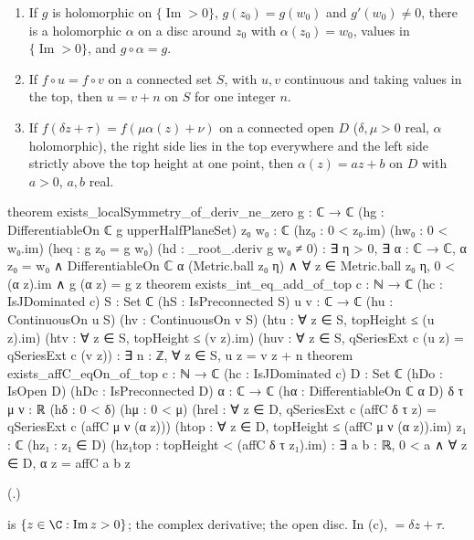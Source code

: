 \begin{theorem}\label{ch19:thm:localtop}
\begin{enumerate}[label=(\alph*)]
\item If $g$ is holomorphic on $\{\operatorname{Im}>0\}$, $g(z_0)=g(w_0)$ and $g'(w_0)\ne0$, there is a holomorphic $\alpha$ on a disc
  around $z_0$ with $\alpha(z_0)=w_0$, values in $\{\operatorname{Im}>0\}$, and $g\circ\alpha=g$.
\item If $f\circ u=f\circ v$ on a connected set $S$, with $u,v$ continuous and taking values in the top, then $u=v+n$ on $S$ for one
  integer $n$.
\item If $f(\delta z+\tau)=f(\mu\alpha(z)+\nu)$ on a connected open $D$ ($\delta,\mu>0$ real, $\alpha$ holomorphic), the right side lies in the
  top everywhere and the left side strictly above the top height at one point, then $\alpha(z)=az+b$ on $D$ with $a>0$, $a,b$ real.
\end{enumerate}
\end{theorem}
\begin{leancode}
theorem exists_localSymmetry_of_deriv_ne_zero {g : ℂ → ℂ}
    (hg : DifferentiableOn ℂ g upperHalfPlaneSet) {z₀ w₀ : ℂ} (hz₀ : 0 < z₀.im)
    (hw₀ : 0 < w₀.im) (heq : g z₀ = g w₀) (hd : _root_.deriv g w₀ ≠ 0) :
    ∃ η > 0, ∃ α : ℂ → ℂ, α z₀ = w₀ ∧ DifferentiableOn ℂ α (Metric.ball z₀ η) ∧
      ∀ z ∈ Metric.ball z₀ η, 0 < (α z).im ∧ g (α z) = g z
theorem exists_int_eq_add_of_top {c : ℕ → ℂ} (hc : IsJDominated c) {S : Set ℂ}
    (hS : IsPreconnected S) {u v : ℂ → ℂ} (hu : ContinuousOn u S) (hv : ContinuousOn v S)
    (htu : ∀ z ∈ S, topHeight ≤ (u z).im) (htv : ∀ z ∈ S, topHeight ≤ (v z).im)
    (huv : ∀ z ∈ S, qSeriesExt c (u z) = qSeriesExt c (v z)) :
    ∃ n : ℤ, ∀ z ∈ S, u z = v z + n
theorem exists_affC_eqOn_of_top {c : ℕ → ℂ} (hc : IsJDominated c) {D : Set ℂ} (hDo : IsOpen D)
    (hDc : IsPreconnected D) {α : ℂ → ℂ} (hα : DifferentiableOn ℂ α D) {δ τ μ ν : ℝ}
    (hδ : 0 < δ) (hμ : 0 < μ)
    (hrel : ∀ z ∈ D, qSeriesExt c (affC δ τ z) = qSeriesExt c (affC μ ν (α z)))
    (htop : ∀ z ∈ D, topHeight ≤ (affC μ ν (α z)).im) {z₁ : ℂ} (hz₁ : z₁ ∈ D)
    (hz₁top : topHeight < (affC δ τ z₁).im) :
    ∃ a b : ℝ, 0 < a ∧ ∀ z ∈ D, α z = affC a b z
\end{leancode}
(.)
\begin{dictionary}
 is $\{z\in\C:\operatorname{Im}z>0\}$;  the complex derivative;
 the open disc.  In (c),  $=\delta z+\tau$.
\end{dictionary}
